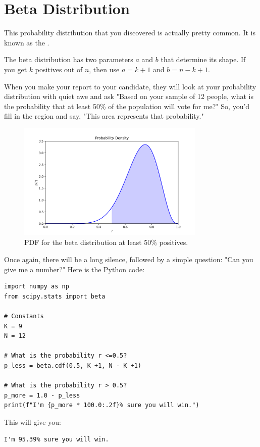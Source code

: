\section{Beta Distribution}

This probability distribution that you discovered is actually pretty common. It is known as the .  

The beta distribution has two parameters $a$ and $b$ that determine its shape. If you get $k$ positives out of $n$, then use $a = k +1$ and $b = n - k + 1$.

When you make your report to your candidate, they will look at your probability distribution with quiet awe and ask "Based on your sample of 12 people, what is the probability that at least 50\% of the population will vote for me?" So, you'd fill in the region and say, "This area represents that probability."
\begin{figure}[htbp]
    \centering
    \includegraphics[width=0.8\textwidth]{bayes50.png}
    \caption{PDF for the beta distribution at least 50\% positives.}
    \label{fig:bayes50}
\end{figure}

Once again, there will be a long silence, followed by a simple question: "Can you give me a number?" Here is the Python code:

\begin{verbatim}
import numpy as np
from scipy.stats import beta

# Constants
K = 9
N = 12

# What is the probability r <=0.5?
p_less = beta.cdf(0.5, K +1, N - K +1)

# What is the probability r > 0.5?
p_more = 1.0 - p_less
print(f"I'm {p_more * 100.0:.2f}% sure you will win.")
\end{verbatim}

This will give you:
\begin{verbatim}
I'm 95.39% sure you will win.
\end{verbatim}






